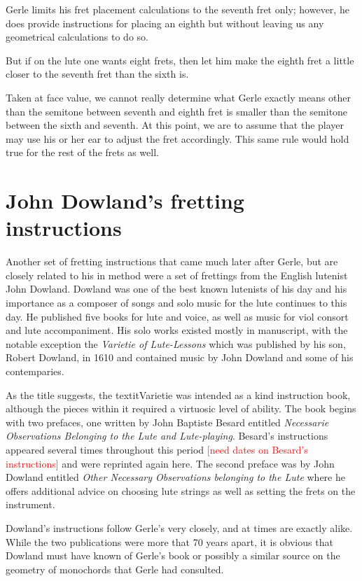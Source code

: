 Gerle limits his fret placement calculations to the seventh fret only; however,
he does provide instructions for placing an eighth but without leaving us any
geometrical calculations to do so.
\begin{blocks}
But if on the lute one wants eight frets, then let him make the eighth fret a
little closer to the seventh fret than the sixth is.
\end{blocks}
Taken at face value, we cannot really determine what Gerle exactly means other
than the semitone between seventh and eighth fret is smaller than the semitone
between the sixth and seventh.  At this point, we are to assume that the player
may use his or her ear to adjust the fret accordingly.  This same rule would
hold true for the rest of the frets as well.

%
%
\section{John Dowland's fretting instructions}

Another set of fretting instructions that came much later after Gerle, but are closely
related to his in method were a set of frettings from the English lutenist John Dowland.
Dowland was one of the best known lutenists of his day and his importance
as a composer of songs and solo music for the lute continues to this day.
He published five books for lute and voice, as well as music for viol consort
and lute accompaniment.  His solo works existed mostly in manuscript, with the
notable exception the \textit{Varietie of Lute-Lessons} which was published
by his son, Robert Dowland, in 1610 and contained music by John Dowland and
some of his contemparies.

As the title suggests, the textit{Varietie} was intended as a
kind instruction book, although the pieces within it required a virtuosic level
of ability.  The book begins with two prefaces, one written by John Baptiste Besard
entitled \textit{Necessarie Observations Belonging to the Lute and Lute-playing}.
Besard's instructions appeared several times throughout this period \textcolor{red}{[need dates on Besard's instructions]}
and were reprinted again here.  The second preface was by John Dowland entitled
\textit{ Other Necessary Observations belonging to the Lute} where he offers additional
advice on choosing lute strings as well as setting the frets on the instrument.

Dowland's instructions follow Gerle's very closely, and at times are exactly alike.
While the two publications were more that 70 years apart, it
is obvious that Dowland must have known of Gerle's book or possibly a similar
source on the geometry of monochords that Gerle had consulted.


